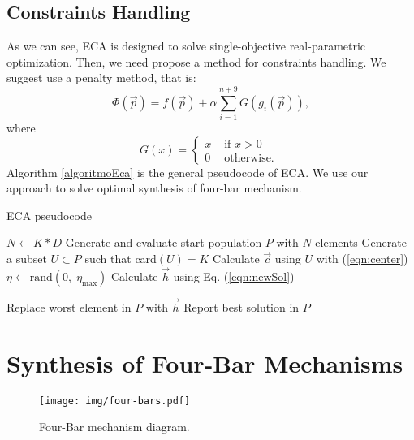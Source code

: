\documentclass[12pt,letterpape]{article}
\begin{document}

\subsection{Constraints Handling} %
\label{sub:constraints_handling}

As we can see, ECA is designed to solve single-objective real-parametric optimization. Then, we need propose a method for constraints handling. We suggest use a penalty
method, that is:
% 
\begin{equation}
	\Phi( \vec{p} ) = f( \vec{p} ) + \alpha \sum_{i=1}^{n+9} G(g_i( \vec{p} ) ),
% 
	\label{eqn:phiObj}
% 
\end{equation}
where 
$$
G(x) = 
\begin{cases}
	\displaystyle
	x & \text{ if } x > 0 \\
	0 & \text{ otherwise. }
\end{cases}
$$
% 
Algorithm \ref{algoritmoEca} is the general pseudocode of ECA. We use our approach
to solve optimal synthesis of four-bar mechanism.

\begin{algorithm}[!ht]
	\caption{ECA pseudocode}
	\label{algoritmoEca}
	\begin{algorithmic}[1]
		\State $N \gets K * D$
		\State Generate and evaluate start population $P$ with $N$ elements
				\State Generate a subset $U \subset P$ such that  card$(U) = K$
				\State Calculate $\vec{c}$ using $U$ with (\ref{eqn:center})
				\State $\eta \gets \text{rand}(0,\; \eta_{\max}) $ 
				\State Calculate $\vec{h}$ using Eq. (\ref{eqn:newSol})
				
					\State Replace worst element in $P$ with $\vec{h}$
				\EndIf
			\EndFor
		\EndWhile
		\State Report best solution in $P$
		\EndProcedure
	\end{algorithmic}
\end{algorithm}

\section{Synthesis of Four-Bar Mechanisms} %
\label{sec:synthesis_of_four_bar_mechanisms}

\begin{figure}[!ht]
	\centering
	\texttt{[image: img/four-bars.pdf]}
	\caption{Four-Bar mechanism diagram.}
	\label{fig:fourbar}
\end{figure}
\end{document}
